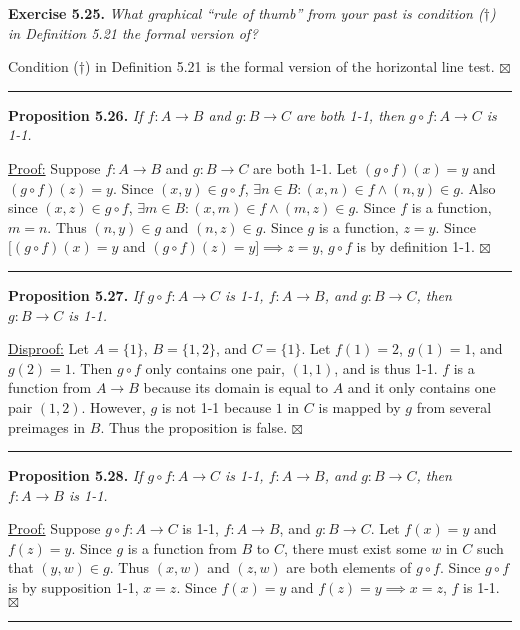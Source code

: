 \documentclass[a4paper,12pt]{article}
\newcommand{\entry}[3]
{
   \noindent\textbf{#1.}
   \emph{#2}
   \bigskip

   \noindent#3
   \bigskip
   \hrule
   \vspace{24pt}
}
\newcommand{\sig}{$\boxtimes$}
\begin{document}
\entry{Exercise 5.25}
{What graphical ``rule of thumb'' from your past is condition ($\dagger$) in Definition 5.21 the formal version of?}
{
Condition ($\dagger$) in Definition 5.21 is the formal version of the horizontal line test. \sig
}



\entry{Proposition 5.26}
{If $f : A \to B$ and $g : B \to C$ are both 1-1, then $g \circ f : A \to C$ is 1-1.}
{
\underline{Proof:} Suppose $f : A \to B$ and $g : B \to C$ are both 1-1. Let $(g \circ f)(x) = y$ and $(g \circ f)(z) = y$. Since $(x, y) \in g \circ f$, $\exists n \in B : (x, n) \in f \land (n, y) \in g$. Also since $(x, z) \in g \circ f$, $\exists m \in B : (x, m) \in f \land (m, z) \in g$. Since $f$ is a function, $m = n$. Thus $(n, y) \in g$ and $(n, z) \in g$. Since $g$ is a function, $z = y$. Since $[(g \circ f)(x) = y$ and $(g \circ f)(z) = y] \implies z = y$, $g \circ f$ is by definition 1-1. \sig
}



\entry{Proposition 5.27}
{If $g \circ f : A \to C$ is 1-1, $f : A \to B$, and $g : B \to C$, then $g : B \to C$ is 1-1.}
{
\underline{Disproof:} Let $A = \{ 1 \}$, $B = \{ 1, 2 \}$, and $C = \{ 1 \}$. Let $f(1) = 2$, $g(1) = 1$, and $g(2) = 1$. Then $g \circ f$ only contains one pair, $(1, 1)$, and is thus 1-1. $f$ is a function from $A \to B$ because its domain is equal to $A$ and it only contains one pair $(1, 2)$. However, $g$ is not 1-1 because $1$ in $C$ is mapped by $g$ from several preimages in $B$. Thus the proposition is false. \sig
}



\entry{Proposition 5.28}
{If $g \circ f : A \to C$ is 1-1, $f : A \to B$, and $g : B \to C$, then $f : A \to B$ is 1-1.}
{
\underline{Proof:} Suppose $g \circ f : A \to C$ is 1-1, $f : A \to B$, and $g : B \to C$. Let $f(x) = y$ and $f(z) = y$. Since $g$ is a function from $B$ to $C$, there must exist some $w$ in $C$ such that $(y, w) \in g$. Thus $(x, w)$ and $(z, w)$ are both elements of $g \circ f$. Since $g \circ f$ is by supposition 1-1, $x = z$. Since $f(x) = y$ and $f(z) = y \implies x = z$, $f$ is 1-1. \sig
}
\end{document}
